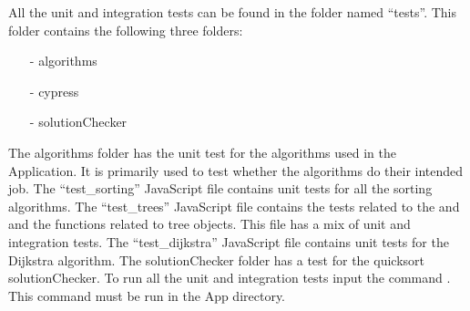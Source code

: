 All the unit and integration tests can be found in the folder named “tests”. This folder contains the following three folders:
\begin{itemize}
    \item[-] algorithms
    \item[-] cypress
    \item[-] solutionChecker
\end{itemize}
The algorithms folder has the unit test for the algorithms used in the Application. It is primarily used to test whether the algorithms do their intended job. The “test\_sorting” JavaScript file contains unit tests for all the sorting algorithms. The “test\_trees” JavaScript file contains the tests related to the  and  and the functions related to tree objects. This file has a mix of unit and integration tests. The “test\_dijkstra” JavaScript file contains unit tests for the Dijkstra algorithm. The solutionChecker folder has a test for the quicksort solutionChecker. To run all the unit and integration tests input the command . This command must be run in the App directory.

